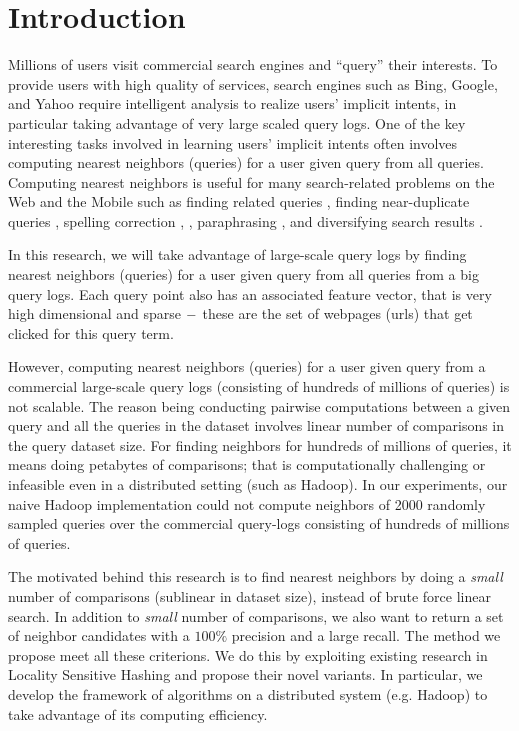 
 \section{Introduction}
Millions of users visit commercial search engines and ``query'' 
their interests. To provide users with high quality of services, 
search engines such as Bing, Google, and Yahoo require
intelligent analysis to realize users' implicit intents, in particular taking
advantage of very large scaled query logs.  One of the key
interesting tasks involved in learning users' implicit intents often involves 
computing nearest neighbors (queries) for a user given query from all queries. 
Computing nearest neighbors is useful for 
many search-related problems on the Web and the Mobile such as 
finding related queries \cite{Jones06WWW,Jain11SIGIR,Song12WSDM}, 
finding near-duplicate queries \cite{}, spelling correction \cite{},  
, paraphrasing \cite{petrovicNAACL12,ganitkevitch13Paraphrase}, 
and diversifying search results \cite{Song11SIGIR}.  

In this research,  we will take advantage of large-scale query logs 
by finding nearest neighbors (queries) for a user given query from all 
queries from a big query logs. Each query point also has an associated feature vector, that is
very high dimensional and sparse $\--$ these are the set of webpages (urls) that get clicked for this query term.

However, computing nearest neighbors (queries) for a user given query 
from a commercial large-scale query logs (consisting of hundreds of millions of  queries) is not scalable. 
The reason being conducting pairwise computations between a given query and all the queries in the dataset involves 
linear number of comparisons in the query dataset size. For finding neighbors for hundreds of millions of queries, 
it means doing petabytes of comparisons; that is computationally challenging or infeasible even in a distributed setting (such as Hadoop). 
In our experiments, our naive Hadoop implementation could not compute neighbors of 
2000 randomly sampled queries over the commercial query-logs 
consisting of hundreds of millions of queries.  

The motivated behind this research is to find nearest neighbors by doing a 
\emph{small} number of comparisons (sublinear in dataset size), instead of brute force linear search. 
In addition to \emph{small} number of comparisons, we also want to 
return a set of neighbor candidates with a $100\%$ precision and a large recall. 
The method we propose meet all these criterions. We do this by exploiting 
existing research in Locality Sensitive Hashing 
\cite{Indyk98STOC,Charikar02STOC,Andoni06FOCS,Andoni08CACM} and propose their 
novel variants. In particular, we develop the framework of  \lsh algorithms on a distributed 
system (e.g. Hadoop) to take advantage of its computing efficiency.


